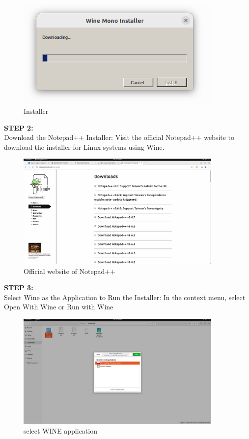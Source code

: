 \documentclass[12pt]{article}
\begin{document}
\begin{spacing}{1.5}
\begin{adjustwidth}{0cm}{0cm}
\begin{justify}
\begin{figure}[H]
    \centering
    \includegraphics[width=0.9\textwidth]{exp 4/image.png}
    \caption{Installer}
    \label{fig: 1}
\end{figure}

\textbf{STEP 2:} \\
Download the Notepad++ Installer: Visit the official Notepad++ website to download the installer for Linux systems using Wine.

\begin{figure}[H]
    \centering
    \includegraphics[width=0.9\textwidth]{exp 4/Screenshot from 2024-09-18 10-12-51.png}
    \caption{Official website of Notepad++}
    \label{fig: 1}
\end{figure}

\textbf{STEP 3:} \\
Select Wine as the Application to Run the Installer: In the context menu, select Open With Wine or Run with Wine

\begin{figure}[H]
    \centering
    \includegraphics[width=0.9\textwidth]{exp 4/Screenshot from 2024-09-18 10-13-20.png}
    \caption{select WINE application}
    \label{fig: 1}
\end{figure}


\end{justify}
\end{adjustwidth}
\end{spacing}
\end{document}
